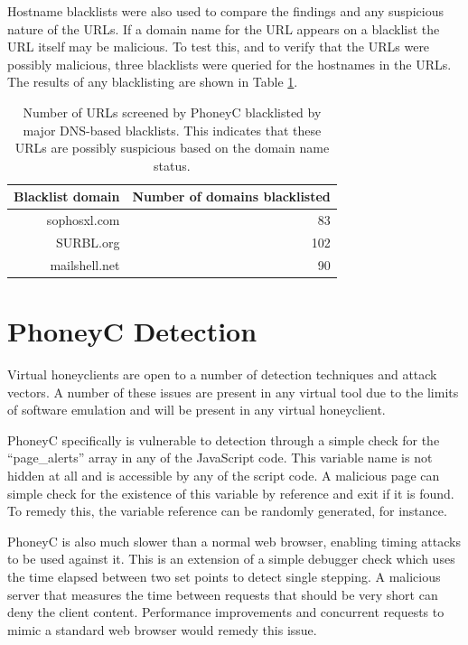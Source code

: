 \documentclass[10pt,twocolumn]{article}
\begin{document}
Hostname blacklists were also used to compare the findings and any suspicious nature of the URLs. If a domain name for the URL appears on a blacklist the URL itself may be malicious. To test this, and to verify that the URLs were possibly malicious, three blacklists were queried for the hostnames in the URLs. The results of any blacklisting are shown in Table \ref{blacklist}. 

\begin{table}
\centering
\begin{tabular}{r|r}
\hline
{\bf Blacklist domain} & {Number of domains blacklisted} \\
\hline
sophosxl.com & 83 \\
SURBL.org & 102 \\
mailshell.net & 90 \\ 
\hline
\end{tabular}
\bigskip
\scriptsize
\caption{Number of URLs screened by PhoneyC blacklisted by major DNS-based blacklists. This indicates that these URLs are possibly suspicious based on the domain name status.}
\normalsize
\bigskip
\label{blacklist}
\end{table}
\section{PhoneyC Detection}
\label{weaknesses}

Virtual honeyclients are open to a number of detection techniques and attack vectors. A number of these issues are present in any virtual tool due to the limits of software emulation and will be present in any virtual honeyclient. 

PhoneyC specifically is vulnerable to detection through a simple check for the ``page\_alerts'' array in any of the JavaScript code. This variable name is not hidden at all and is accessible by any of the script code. A malicious page can simple check for the existence of this variable by reference and exit if it is found. To remedy this, the variable reference can be randomly generated, for instance.

PhoneyC is also much slower than a normal web browser, enabling timing attacks to be used against it. This is an extension of a simple debugger check which uses the time elapsed between two set points to detect single stepping. A malicious server that measures the time between requests that should be very short can deny the client content. Performance improvements and concurrent requests to mimic a standard web browser would remedy this issue.
\end{document}
